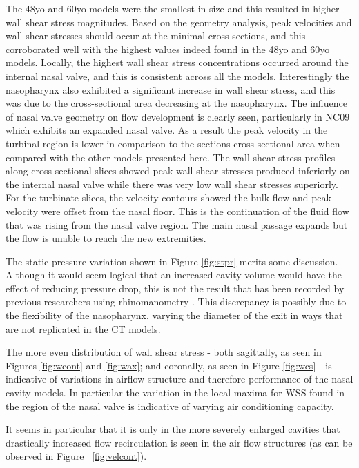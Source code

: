 The 48yo and 60yo models were the smallest in size and this resulted in higher wall shear stress magnitudes. Based on the geometry analysis, peak velocities and wall shear stresses should occur at the minimal cross-sections, and this corroborated well with the highest values indeed found in the 48yo and 60yo models. Locally, the highest wall shear stress concentrations occurred around the internal nasal valve, and this is consistent across all the models. Interestingly the nasopharynx also exhibited a significant increase in wall shear stress, and this was due to the cross-sectional area decreasing at the nasopharynx.
The influence of nasal valve geometry on flow development is clearly seen, particularly in NC09 which exhibits an expanded nasal valve. As a result the peak velocity in the turbinal region is lower in comparison to the sections cross sectional area when compared with the other models presented here.
The wall shear stress profiles along cross-sectional slices showed peak wall shear stresses produced inferiorly on the internal nasal valve while there was very low wall shear stresses superiorly. For the turbinate slices, the velocity contours showed the bulk flow and peak velocity were offset from the nasal floor. This is the continuation of the fluid flow that was rising from the nasal valve region. The main nasal passage expands but the flow is unable to reach the new extremities.

The static pressure variation shown in Figure \ref{fig:stpr} merits some discussion. Although it would seem logical that an increased cavity volume would have the effect of reducing pressure drop, this is not the result that has been recorded by previous researchers using rhinomanometry \cite{Lindemann2008}. This discrepancy is possibly due to the flexibility of the nasopharynx, varying the diameter of the exit in ways that are not replicated in the CT models.

The more even distribution of wall shear stress - both sagittally, as seen in Figures \ref{fig:wcont} and \ref{fig:wax}; and coronally, as seen in Figure \ref{fig:wcs} - is indicative of variations in airflow structure and therefore performance of the nasal cavity models. In particular the variation in the local maxima for WSS found in the region of the nasal valve is indicative of varying air conditioning capacity.

It seems in particular that it is only in the more severely enlarged cavities that drastically increased flow recirculation is seen in the air flow structures (as can be observed in Figure ~\ref{fig:velcont}).

